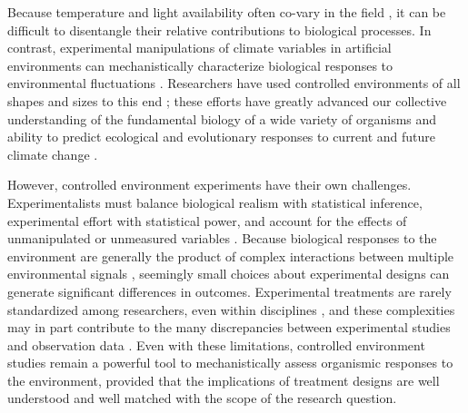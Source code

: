 \documentclass[11pt]{article}
\begin{document}
\noindent Because temperature and light availability often co-vary in the field \citep[for example, in most temperate ecosystems, daylength and temperature both increase as the season progresses,][]{Rosenberg1974}, it can be difficult to disentangle their relative contributions to biological processes. In contrast, experimental manipulations of climate variables in artificial environments can mechanistically characterize biological responses to environmental fluctuations \citep{Ettinger:2020aa,Primack2015}. Researchers have used controlled environments of all shapes and sizes to this end \citep{Downs:1980us}; these efforts have greatly advanced our collective understanding of the fundamental biology of a wide variety of organisms and ability to predict ecological and evolutionary responses to current and future climate change \citep{Stewart:2013wz}.

However, controlled environment experiments have their own challenges. Experimentalists must balance biological realism with statistical inference, experimental effort with statistical power, and account for the effects of unmanipulated or unmeasured variables \citep{schneiner2001}. Because biological responses to the environment are generally the product of complex interactions between multiple environmental signals \citep{Casal:2002vz}, seemingly small choices about experimental designs can generate significant differences in outcomes. Experimental treatments are rarely standardized among researchers, even within disciplines \citep{Wolkovich_2022}, and these complexities may in part contribute to the many discrepancies between experimental studies and observation data \citep{Poorter:2016aa}. Even with these limitations, controlled environment studies remain a powerful tool to mechanistically assess organismic responses to the environment, provided that the implications of treatment designs are well understood and well matched with the scope of the research question. 
\end{document}
